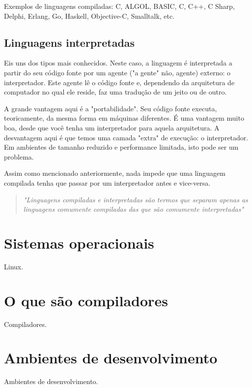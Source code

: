 Exemplos de linguagens compiladas: C, ALGOL, BASIC, C, C++, C Sharp, Delphi, Erlang, Go, Haskell, Objective-C, Smalltalk, etc.

\subsection{Linguagens interpretadas}

Eis uns dos tipos mais conhecidos. Neste caso, a linguagem é interpretada a partir do seu código fonte por um agente ("a gente" não, agente) externo: o interpretador. Este agente lê o código fonte e, dependendo da arquitetura de computador no qual ele reside, faz uma tradução de um jeito ou de outro.

A grande vantagem aqui é a "portabilidade". Seu código fonte executa, teoricamente, da mesma forma em máquinas diferentes. É uma vantagem muito boa, desde que você tenha um interpretador para aquela arquitetura. A desvantagem aqui é que temos uma camada "extra" de execução: o interpretador. Em ambientes de tamanho reduzido e performance limitada, isto pode ser um problema.

Assim como mencionado anteriormente, nada impede que uma linguagem compilada tenha que passar por um interpretador antes e vice-versa.

\begin{quotation}
\textit{"Linguagens compiladas e interpretadas são termos que separam apenas as linguagens comumente compiladas das que são comumente interpretadas"}
\end{quotation}


\section{Sistemas operacionais}

Linux.


\section{O que são compiladores}

Compiladores.


\section{Ambientes de desenvolvimento}

Ambientes de desenvolvimento.


